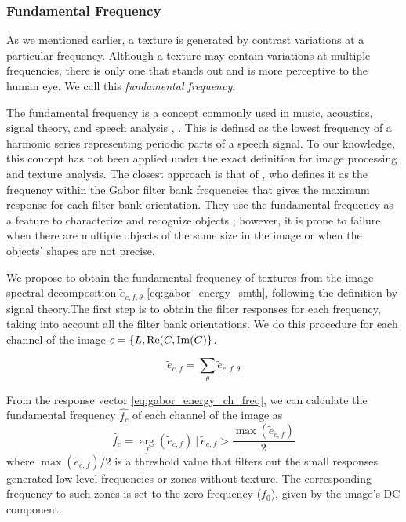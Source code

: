 \subsubsection{Fundamental Frequency}
As we mentioned earlier, a texture is generated by contrast variations at a particular frequency. Although a texture may contain variations at multiple frequencies, there is only one that stands out and is more perceptive to the human eye. We call this \textit{fundamental frequency}.

The fundamental frequency is a concept commonly used in music, acoustics, signal theory, and speech analysis \citep{Benward:BOOK:2014}, \citep{Sigmund:ITC:2013}. This is defined as the lowest frequency of a harmonic series representing periodic parts of a speech signal. To our knowledge, this concept has not been applied under the exact definition for image processing and texture analysis. The closest approach is that of \cite{Kamarainen.Kyrki.ea:ICPR:2002}, who defines it as the frequency within the Gabor filter bank frequencies that gives the maximum response for each filter bank orientation. They use the fundamental frequency as a feature to characterize and recognize objects \citep{Kamarainen.Kyrki.ea:DSP:2002}; however, it is prone to failure when there are multiple objects of the same size in the image or when the objects' shapes are not precise.

We propose to obtain the fundamental frequency of textures from the image spectral decomposition $\widetilde{e}_{c, f, \theta}$ \eqref{eq:gabor_energy_smth}, following the definition by signal theory.The first step is to obtain the filter responses for each frequency, taking into account all the filter bank orientations. We do this procedure for each channel of the image $c=\{L, \mathrm{Re}(C, \mathrm{Im}(C)\}$.

\begin{equation}
	\widetilde{e}_{c, f} =  \underset{\theta }{\sum} \widetilde{e}_{c, f, \theta}  \label{eq:gabor_energy_ch_freq}
\end{equation}

From the response vector \eqref{eq:gabor_energy_ch_freq}, we can calculate the fundamental frequency $\widehat{f_c}$ of each channel of the image as
\begin{equation}
	\widetilde{f_c} =  \underset{f}{\arg} (\widetilde{e}_{c, f}) ~|~ \widetilde{e}_{c, f} > \frac{\max(\widetilde{e}_{c, f})}{2} \label{eq:gabor_energy_ch_freq}
\end{equation}
where $\max(\widetilde{e}_{c, f})/2$ is a threshold value that filters out the small responses generated low-level frequencies or zones without texture. The corresponding frequency to such zones is set to the zero frequency ($f_0$), given by the image's DC component.

